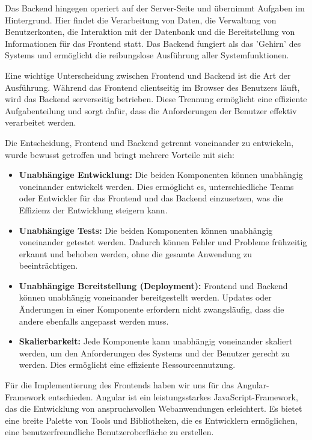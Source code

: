 \noindent Das Backend hingegen operiert auf der Server-Seite und übernimmt Aufgaben im Hintergrund. 
Hier findet die Verarbeitung von Daten, die Verwaltung von Benutzerkonten, die Interaktion mit der 
Datenbank und die Bereitstellung von Informationen für das Frontend statt. 
Das Backend fungiert als das 'Gehirn' des Systems und ermöglicht die reibungslose Ausführung 
aller Systemfunktionen.\newline

\noindent Eine wichtige Unterscheidung zwischen Frontend und Backend ist die Art der Ausführung. 
Während das Frontend clientseitig im Browser des Benutzers läuft, wird das Backend serverseitig 
betrieben. Diese Trennung ermöglicht eine effiziente Aufgabenteilung und sorgt dafür, 
dass die Anforderungen der Benutzer effektiv verarbeitet werden.\newline

\noindent Die Entscheidung, Frontend und Backend getrennt voneinander zu entwickeln, 
wurde bewusst getroffen und bringt mehrere Vorteile mit sich:

\begin{itemize}
  \item \textbf{Unabhängige Entwicklung:} Die beiden Komponenten können unabhängig voneinander 
  entwickelt werden. Dies ermöglicht es, unterschiedliche Teams oder Entwickler für das Frontend 
  und das Backend einzusetzen, was die Effizienz der Entwicklung steigern kann.
  \item \textbf{Unabhängige Tests:} Die beiden Komponenten können unabhängig voneinander getestet 
  werden. Dadurch können Fehler und Probleme frühzeitig erkannt und behoben werden, ohne die 
  gesamte Anwendung zu beeinträchtigen.
  \item \textbf{Unabhängige Bereitstellung (Deployment):} Frontend und Backend können unabhängig 
  voneinander bereitgestellt werden. Updates oder Änderungen in einer Komponente erfordern 
  nicht zwangsläufig, dass die andere ebenfalls angepasst werden muss.
  \item \textbf{Skalierbarkeit:} Jede Komponente kann unabhängig voneinander skaliert werden, 
  um den Anforderungen des Systems und der Benutzer gerecht zu werden. Dies ermöglicht eine 
  effiziente Ressourcennutzung.
\end{itemize}

\noindent Für die Implementierung des Frontends haben wir uns für das Angular-Framework entschieden.
Angular ist ein leistungsstarkes JavaScript-Framework, das die Entwicklung von anspruchsvollen 
Webanwendungen erleichtert. Es bietet eine breite Palette von Tools und Bibliotheken, 
die es Entwicklern ermöglichen, eine benutzerfreundliche Benutzeroberfläche zu erstellen. \newline

